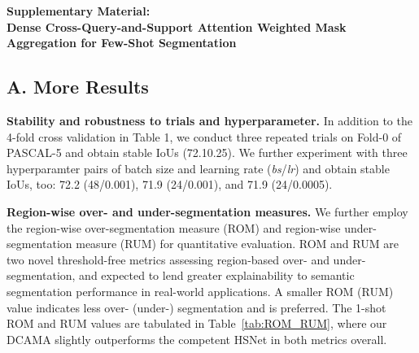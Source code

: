 \documentclass[runningheads,table,xcdraw]{llncs}
\begin{document}


\newpage
\begin{center}
\textbf{\large Supplementary Material:\\Dense Cross-Query-and-Support Attention Weighted Mask Aggregation for Few-Shot Segmentation}
\end{center}
\setcounter{equation}{0}
\setcounter{figure}{0}
\setcounter{table}{0}
\setcounter{page}{1}
\makeatletter
\renewcommand{\theequation}{S\arabic{equation}}
\renewcommand{\thefigure}{S\arabic{figure}}
\renewcommand{\thetable}{S\arabic{table}}
\renewcommand{\thepage}{S\arabic{page}}
{\color{purple}
\subsection*{A. More Results}
\textbf{Stability and robustness to trials and hyperparameter.}
In addition to the 4-fold cross validation in Table 1, we conduct three repeated trials on Fold-0 of PASCAL-5
and obtain stable IoUs (72.10.25).
We further experiment with
three hyperparamter pairs of batch size and learning rate (\textit{bs}/\textit{lr})
and obtain stable IoUs, too:
72.2 (48/0.001), 71.9 (24/0.001), and 71.9 (24/0.0005).

\textbf{Region-wise over- and under-segmentation measures.}
We further employ the region-wise over-segmentation measure (ROM) and region-wise under-segmentation measure (RUM) \cite{zhang2021rethinking} for quantitative evaluation.
ROM and RUM are two novel threshold-free metrics assessing region-based over- and under-segmentation, and expected to lend greater explainability to semantic segmentation performance in real-world applications.
A smaller ROM (RUM) value indicates less over- (under-) segmentation and is preferred.
The 1-shot ROM and RUM values are tabulated in Table~\ref{tab:ROM_RUM}, where our DCAMA slightly outperforms the competent HSNet in both metrics overall.


}
\end{document}

